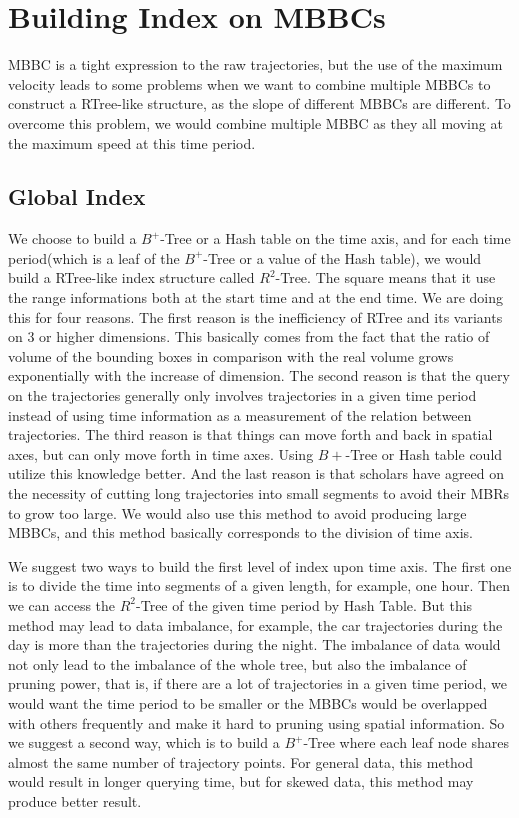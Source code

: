 \documentclass[sigplan]{acmart}
\begin{document}
\section{Building Index on MBBCs}
MBBC is a tight expression to the raw trajectories, but the use of the maximum velocity leads to some problems when we want to combine multiple MBBCs to construct a RTree-like structure, as the slope of different MBBCs are different. To overcome this problem, we would combine multiple MBBC as they all moving at the maximum speed at this time period.
\subsection{Global Index}
We choose to build a $B^+$-Tree or a Hash table on the time axis, and for each time period(which is a leaf of the $B^+$-Tree or a value of the Hash table), we would build a RTree-like index structure called $R^2$-Tree. The square means that it use the range informations both at the start time and at the end time. We are doing this for four reasons.
\indent The first reason is the inefficiency of RTree and its variants on 3 or higher dimensions. This basically comes from the fact that the ratio of volume of the bounding boxes in comparison with the real volume grows exponentially with the increase of dimension.
\indent The second reason is that the query on the trajectories generally only involves trajectories in a given time period instead of using time information as a measurement of the relation between trajectories.
\indent The third reason is that things can move forth and back in spatial axes, but can only move forth in time axes. Using $B+$-Tree or Hash table could utilize this knowledge better.
\indent And the last reason is that scholars have agreed on the necessity of cutting long trajectories into small segments to avoid their MBRs to grow too large. We would also use this method to avoid producing large MBBCs, and this method basically corresponds to the division of time axis.\par

We suggest two ways to build the first level of index upon time axis. The first one is to divide the time into segments of a given length, for example, one hour. Then we can access the $R^2$-Tree of the given time period by Hash Table. But this method may lead to data imbalance, for example, the car trajectories during the day is more than the trajectories during the night. The imbalance of data would not only lead to the imbalance of the whole tree, but also the imbalance of pruning power, that is, if there are a lot of trajectories in a given time period, we would want the time period to be smaller or the MBBCs would be overlapped with others frequently and make it hard to pruning using spatial information. So we suggest a second way, which is to build a $B^+$-Tree where each leaf node shares almost the same number of trajectory points. For general data, this method would result in longer querying time, but for skewed data, this method may produce better result.\par
\end{document}
